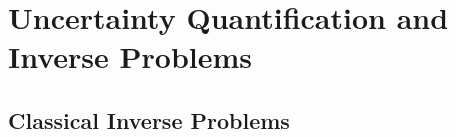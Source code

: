 \section{Uncertainty Quantification and Inverse Problems} \label{sec:UQIP}
\subsection{Classical Inverse Problems}\label{sec:IP}
\lipsum